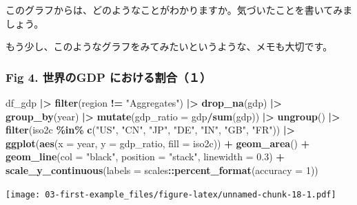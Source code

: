 \documentclass[
  xelatex, ja=standard]{bxjsbook}
\newenvironment{Shaded}{\begin{snugshade}}{\end{snugshade}}
\newcommand{\AttributeTok}[1]{\textcolor[rgb]{0.13,0.29,0.53}{#1}}
\newcommand{\DecValTok}[1]{\textcolor[rgb]{0.00,0.00,0.81}{#1}}
\newcommand{\FloatTok}[1]{\textcolor[rgb]{0.00,0.00,0.81}{#1}}
\newcommand{\FunctionTok}[1]{\textcolor[rgb]{0.13,0.29,0.53}{\textbf{#1}}}
\newcommand{\NormalTok}[1]{#1}
\newcommand{\SpecialCharTok}[1]{\textcolor[rgb]{0.81,0.36,0.00}{\textbf{#1}}}
\newcommand{\StringTok}[1]{\textcolor[rgb]{0.31,0.60,0.02}{#1}}
\theoremstyle{definition}
\theoremstyle{definition}
\theoremstyle{definition}
\theoremstyle{definition}
\theoremstyle{remark}
\begin{document}
このグラフからは、どのようなことがわかりますか。気づいたことを書いてみましょう。

もう少し、このようなグラフをみてみたいというような、メモも大切です。

\hypertarget{fig-4.-ux4e16ux754cux306egdp-ux306bux304aux3051ux308bux5272ux5408uxff11}{%
\subsubsection{Fig 4. 世界のGDP における割合（１）}\label{fig-4.-ux4e16ux754cux306egdp-ux306bux304aux3051ux308bux5272ux5408uxff11}}

\begin{Shaded}
\begin{Highlighting}[]
\NormalTok{df\_gdp }\SpecialCharTok{|\textgreater{}} 
  \FunctionTok{filter}\NormalTok{(region }\SpecialCharTok{!=} \StringTok{"Aggregates"}\NormalTok{) }\SpecialCharTok{|\textgreater{}} \FunctionTok{drop\_na}\NormalTok{(gdp) }\SpecialCharTok{|\textgreater{}} 
  \FunctionTok{group\_by}\NormalTok{(year) }\SpecialCharTok{|\textgreater{}} \FunctionTok{mutate}\NormalTok{(}\AttributeTok{gdp\_ratio =}\NormalTok{ gdp}\SpecialCharTok{/}\FunctionTok{sum}\NormalTok{(gdp)) }\SpecialCharTok{|\textgreater{}} \FunctionTok{ungroup}\NormalTok{() }\SpecialCharTok{|\textgreater{}}
  \FunctionTok{filter}\NormalTok{(iso2c }\SpecialCharTok{\%in\%} \FunctionTok{c}\NormalTok{(}\StringTok{"US"}\NormalTok{, }\StringTok{"CN"}\NormalTok{, }\StringTok{"JP"}\NormalTok{, }\StringTok{"DE"}\NormalTok{, }\StringTok{"IN"}\NormalTok{, }\StringTok{"GB"}\NormalTok{, }\StringTok{"FR"}\NormalTok{))  }\SpecialCharTok{|\textgreater{}}
  \FunctionTok{ggplot}\NormalTok{(}\FunctionTok{aes}\NormalTok{(}\AttributeTok{x =}\NormalTok{ year, }\AttributeTok{y =}\NormalTok{ gdp\_ratio, }\AttributeTok{fill =}\NormalTok{ iso2c)) }\SpecialCharTok{+} \FunctionTok{geom\_area}\NormalTok{() }\SpecialCharTok{+}
  \FunctionTok{geom\_line}\NormalTok{(}\AttributeTok{col =} \StringTok{"black"}\NormalTok{, }\AttributeTok{position =} \StringTok{"stack"}\NormalTok{, }\AttributeTok{linewidth =} \FloatTok{0.3}\NormalTok{) }\SpecialCharTok{+} 
  \FunctionTok{scale\_y\_continuous}\NormalTok{(}\AttributeTok{labels =}\NormalTok{ scales}\SpecialCharTok{::}\FunctionTok{percent\_format}\NormalTok{(}\AttributeTok{accuracy =} \DecValTok{1}\NormalTok{))}
\end{Highlighting}
\end{Shaded}

\texttt{[image: 03-first-example\_files/figure-latex/unnamed-chunk-18-1.pdf]}
\end{document}
